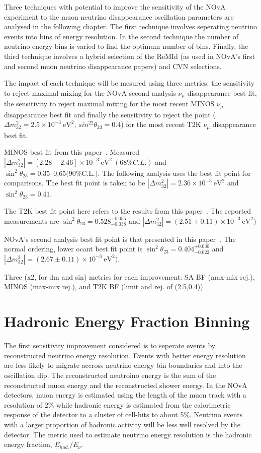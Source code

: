 

Three techniques with potential to improve the sensitivity of the NOvA
experiment to the muon neutrino disappearance oscillation parameters
are analysed in the following chapter. 
The first technique involves seperating neutrino events into bins of
energy resolution. 
In the second technique the number of neutrino energy bins is varied
to find the optimum number of bins.
Finally, the third technique involves a hybrid selection of the ReMId
(as used in NOvA's first and second muon neutrino disappearance
papers) and CVN selections.

The impact of each technique will be mesured using three metrics: the
sensitivity to reject maximal mixing for the NOvA second analysis
$\nu_\mu$ disappearance best fit, the sensitivity to reject maximal
mixing for the most recent MINOS $\nu_\mu$ disappearance best fit and
finally the sensitivity to reject the point ($\Delta m^2_{32} = 2.5
\times 10^{-3}~\text{eV}^2$, $sin^22\theta_{23} = 0.4$) for the most
recent T2K $\nu_\mu$ disappearance best fit.

MINOS best fit from this paper~\cite{adamson2014combined}. Measured
$|\Delta m^2_{32}| = [2.28 - 2.46] \times 10^{-3}~\text{eV}^2~(68\%
C.L.)$ and $\sin^2\theta_{23} = 0.35–0.65 \text{(90\% C.L.)}$. The
following analysis uses the best fit point for comparisons. The best
fit point is taken to be $|\Delta m^2_{32}| = 2.36
\times10^{-3}~\text{eV}^2$ and $\sin^2\theta_{23} = 0.41$. 

The T2K best fit point here refers to the results from this
paper~\cite{abe2015measurements}. The reported measurements are
$\sin^2\theta_{23}=0.528^{+0.055}_{-0.038}$ and $|\Delta
m^2_{32}|=(2.51 \pm 0.11)\times10^{-3}~\text{eV}^2)$

NOvA's second analysis best fit point is that presented in this
paper~\cite{NOvASA}. The normal ordering, lower ocant best fit point is 
$\sin^2\theta_{23} = 0.404^{+0.030}_{-0.022}$ and $|\Delta
m^2_{32}|=(2.67 \pm 0.11)\times10^{-3}~\text{eV}^2)$. 

Three (x2, for dm and sin) metrics for each improvement: SA BF
(max-mix rej.), MINOS (max-mix rej.), and T2K BF (limit and rej. of
(2.5,0.4)) 

\section{Hadronic Energy Fraction Binning}

The first sensitivity improvement considered is to seperate events by
reconstructed neutrino energy resolution. 
Events with better energy resolution are less likely to migrate
accross neutrino energy bin boundaries and into the oscillation dip.
The reconstructed neutroino energy is the sum of the reconstructed
muon energy and the reconstructed shower energy.
In the NOvA detectors, muon energy is estimated using the length of the
muon track with a resolution of 2\% while hadronic energy is estimated
from the calorimetric response of the detector to a cluster of
cell-hits to about 5\%.
Neutrino events with a larger proportion of hadronic activity will be
less well resolved by the detector.
The metric used to estimate neutrino energy resolution is the hadronic
energy fraction, $E_{had.} / E_{\nu}$. 

